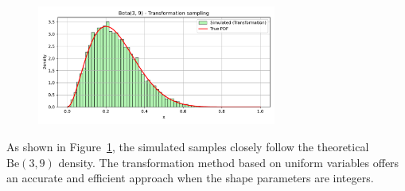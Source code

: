\begin{figure}[H]
    \centering
    \includegraphics[width=0.7\textwidth]{resources/figures/q3-beta_transformation_sampling.pdf}
    \label{fig:beta_transform}
\end{figure}

As shown in Figure~\ref{fig:beta_transform}, the simulated samples closely follow the theoretical $\text{Be}(3, 9)$ density. The transformation method based on uniform variables offers an accurate and efficient approach when the shape parameters are integers.











